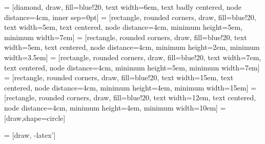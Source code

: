  = [diamond,                    draw, fill=blue!20, text width=6em, text badly centered, node distance=4cm, inner sep=0pt]
 =    [rectangle, rounded corners, draw, fill=blue!20, text width=5em, text centered,       node distance=4cm, minimum height=5em, minimum width=7em]
 =    [rectangle, rounded corners, draw, fill=blue!20, text width=5em, text centered,       node distance=4cm, minimum height=2em, minimum width=3.5em]
 =    [rectangle, rounded corners, draw, fill=blue!20, text width=7em, text centered,       node distance=4cm, minimum height=5em, minimum width=7em]
 =    [rectangle, rounded corners, draw, fill=blue!20, text width=15em, text centered,       node distance=4cm, minimum height=4em, minimum width=15em]
 =    [rectangle, rounded corners, draw, fill=blue!20, text width=12em, text centered,       node distance=4cm, minimum height=4em, minimum width=10em]
=[draw,shape=circle]

 = [draw, -latex']


